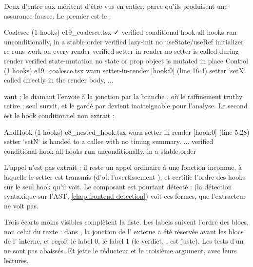 Deux d'entre eux méritent d'être vus en entier, parce qu'ils produisent une assurance  fausse. Le premier est le  :

\begin{sortie}
  Coalesce  (1 hooks)  e19_coalesce.tsx  ✓
    verified  conditional-hook  all hooks run unconditionally, in a stable order
    verified  lazy-init  no useState/useRef initializer re-runs work on every render
    verified  setter-in-render  no setter is called during render
    verified  state-mutation  no state or prop object is mutated in place
  Control  (1 hooks)  e19_coalesce.tsx
    warn   setter-in-render  [hook:0]  (line 16:4)  setter `setX` called directly in the render body, ...
\end{sortie}

 vaut  ; le diamant l'envoie à la jonction par la branche , où le raffinement \og truthy\fg{} retire  ; seul  survit, et le  gardé par  devient inatteignable pour l'analyse. Le second est le hook conditionnel non extrait :

\begin{sortie}
  AndHook  (1 hooks)  e8_nested_hook.tsx
    warn   setter-in-render  [hook:0]  (line 5:28)  setter `setN` is handed to a callee with no timing summary. ...
    verified  conditional-hook  all hooks run unconditionally, in a stable order
\end{sortie}

L'appel  n'est pas extrait ; il reste un appel ordinaire à une fonction inconnue, à laquelle le setter est transmis (d'où l'avertissement ), et  certifie l'ordre des hooks sur le seul hook qu'il voit. Le composant est pourtant détecté :  (la détection syntaxique sur l'AST, \cref{chap:frontend-detection}) voit ces formes, que l'extracteur ne voit pas.

\begin{remarque}
Trois écarts moins visibles complètent la liste. Les labels suivent l'ordre des blocs, non celui du texte : dans , la jonction de l' externe a été réservée avant les blocs de l' interne, et  reçoit le label 0,  le label 1 (le verdict, , est juste). Les tests  d'un  ne sont pas abaissés. Et  jette le réducteur et le troisième argument, avec leurs lectures.
\end{remarque}

